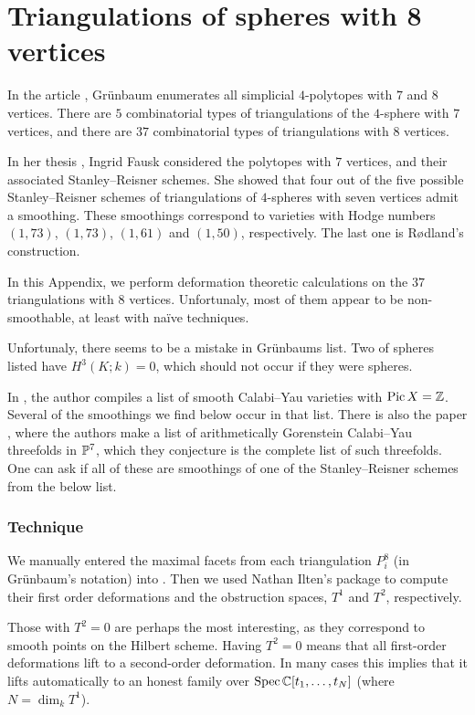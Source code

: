 \chapter{Triangulations of spheres with 8 vertices}
\label{sec:spheres8}

In the article \cite{grunbaum_enumeration}, Grünbaum enumerates all simplicial $4$-polytopes with $7$ and $8$ vertices. There are $5$ combinatorial types of triangulations of the $4$-sphere with $7$ vertices, and there are $37$ combinatorial types of triangulations with $8$ vertices.

In her thesis \cite{fausk_thesis}, Ingrid Fausk considered the polytopes with $7$ vertices, and their associated Stanley--Reisner schemes. She showed that four out of the five possible Stanley--Reisner schemes of triangulations of $4$-spheres with seven vertices admit a smoothing. These smoothings correspond to \CY varieties with Hodge numbers $(1,73)$, $(1,73)$, $(1,61)$ and $(1,50)$, respectively. The last one is Rødland's construction.

In this Appendix, we perform deformation theoretic calculations on the $37$ triangulations with $8$ vertices. Unfortunaly, most of them appear to be non-smoothable, at least with naïve techniques.

Unfortunaly, there seems to be a mistake in Grünbaums list. Two of spheres listed have $H^3(K;k)=0$, which should not occur if they were spheres.

In \cite{kapustka_delpezzo}, the author compiles a list of smooth Calabi--Yau varieties with $\Pic X = \Z$. Several of the smoothings we find below occur in that list. There is also the paper \cite{MR3591944}, where the authors make a list of arithmetically Gorenstein Calabi--Yau threefolds in $\P^7$, which they conjecture is the complete list of such threefolds. One can ask if all of these are smoothings of one of the Stanley--Reisner schemes from the below list.

\subsection{Technique}

We manually entered the maximal facets from each triangulation $P_i^8$ (in Grünbaum's notation) into \MM. Then we used Nathan Ilten's package \cite{ilten_versaldeformations} to compute their first order deformations and the obstruction spaces, $T^1$ and $T^2$, respectively.

Those with $T^2=0$ are perhaps the most interesting, as they correspond to smooth points on the Hilbert scheme. Having $T^2=0$ means that all first-order deformations lift to a second-order deformation. In many cases this implies that it lifts automatically to an honest family over $\Spec \C[t_1,\ldots,t_N]$ (where $N=\dim_k T^1$).

